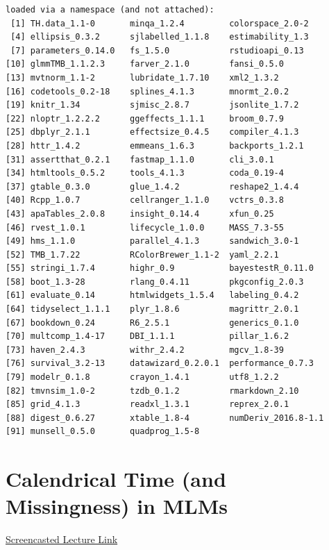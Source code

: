 \documentclass[
  11pt,
]{book}
\begin{document}
\begin{verbatim}
loaded via a namespace (and not attached):
 [1] TH.data_1.1-0       minqa_1.2.4         colorspace_2.0-2   
 [4] ellipsis_0.3.2      sjlabelled_1.1.8    estimability_1.3   
 [7] parameters_0.14.0   fs_1.5.0            rstudioapi_0.13    
[10] glmmTMB_1.1.2.3     farver_2.1.0        fansi_0.5.0        
[13] mvtnorm_1.1-2       lubridate_1.7.10    xml2_1.3.2         
[16] codetools_0.2-18    splines_4.1.3       mnormt_2.0.2       
[19] knitr_1.34          sjmisc_2.8.7        jsonlite_1.7.2     
[22] nloptr_1.2.2.2      ggeffects_1.1.1     broom_0.7.9        
[25] dbplyr_2.1.1        effectsize_0.4.5    compiler_4.1.3     
[28] httr_1.4.2          emmeans_1.6.3       backports_1.2.1    
[31] assertthat_0.2.1    fastmap_1.1.0       cli_3.0.1          
[34] htmltools_0.5.2     tools_4.1.3         coda_0.19-4        
[37] gtable_0.3.0        glue_1.4.2          reshape2_1.4.4     
[40] Rcpp_1.0.7          cellranger_1.1.0    vctrs_0.3.8        
[43] apaTables_2.0.8     insight_0.14.4      xfun_0.25          
[46] rvest_1.0.1         lifecycle_1.0.0     MASS_7.3-55        
[49] hms_1.1.0           parallel_4.1.3      sandwich_3.0-1     
[52] TMB_1.7.22          RColorBrewer_1.1-2  yaml_2.2.1         
[55] stringi_1.7.4       highr_0.9           bayestestR_0.11.0  
[58] boot_1.3-28         rlang_0.4.11        pkgconfig_2.0.3    
[61] evaluate_0.14       htmlwidgets_1.5.4   labeling_0.4.2     
[64] tidyselect_1.1.1    plyr_1.8.6          magrittr_2.0.1     
[67] bookdown_0.24       R6_2.5.1            generics_0.1.0     
[70] multcomp_1.4-17     DBI_1.1.1           pillar_1.6.2       
[73] haven_2.4.3         withr_2.4.2         mgcv_1.8-39        
[76] survival_3.2-13     datawizard_0.2.0.1  performance_0.7.3  
[79] modelr_0.1.8        crayon_1.4.1        utf8_1.2.2         
[82] tmvnsim_1.0-2       tzdb_0.1.2          rmarkdown_2.10     
[85] grid_4.1.3          readxl_1.3.1        reprex_2.0.1       
[88] digest_0.6.27       xtable_1.8-4        numDeriv_2016.8-1.1
[91] munsell_0.5.0       quadprog_1.5-8     
\end{verbatim}

\hypertarget{TimeLord}{%
\chapter{Calendrical Time (and Missingness) in MLMs}\label{TimeLord}}

\href{https://spu.hosted.panopto.com/Panopto/Pages/Viewer.aspx?pid=5ea38416-c682-49f8-ba71-ad390025e36e}{Screencasted Lecture Link}
\end{document}
